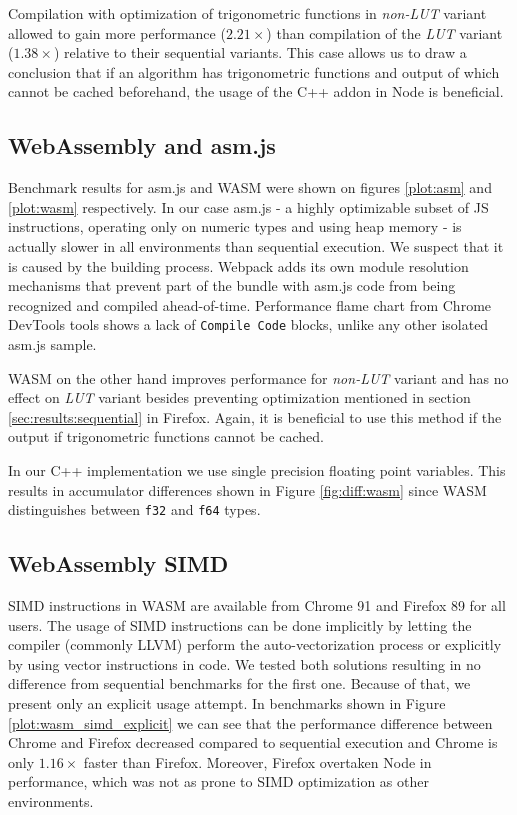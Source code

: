 
Compilation with optimization of trigonometric functions in \textit{non-LUT} variant allowed to gain more performance ($2.21\times$) than compilation of the \textit{LUT} variant ($1.38\times$) relative to their sequential variants. This case allows us to draw a conclusion that if an algorithm has trigonometric functions and output of which cannot be cached beforehand, the usage of the C++ addon in Node is beneficial.

\subsection{WebAssembly and asm.js}\label{sec:results:asm-wasm}

Benchmark results for asm.js and WASM were shown on figures \ref{plot:asm} and \ref{plot:wasm} respectively. In our case asm.js - a highly optimizable subset of JS instructions, operating only on numeric types and using heap memory - is actually slower in all environments than sequential execution. We suspect that it is caused by the building process. Webpack adds its own module resolution mechanisms that prevent part of the bundle with asm.js code from being recognized and compiled ahead-of-time. Performance flame chart from Chrome DevTools tools shows a lack of \texttt{Compile Code} blocks, unlike any other isolated asm.js sample.

WASM on the other hand improves performance for \textit{non-LUT} variant and has no effect on \textit{LUT} variant besides preventing optimization mentioned in section \ref{sec:results:sequential} in Firefox. Again, it is beneficial to use this method if the output if trigonometric functions cannot be cached.

In our C++ implementation we use single precision floating point variables. This results in accumulator differences shown in Figure \ref{fig:diff:wasm} since WASM distinguishes between \texttt{f32} and \texttt{f64} types.






\subsection{WebAssembly SIMD}

SIMD instructions in WASM are available from Chrome 91 and Firefox 89 for all users. The usage of SIMD instructions can be done implicitly by letting the compiler (commonly LLVM) perform the auto-vectorization process or explicitly by using vector instructions in code. We tested both solutions resulting in no difference from sequential benchmarks for the first one. Because of that, we present only an explicit usage attempt. In benchmarks shown in Figure \ref{plot:wasm_simd_explicit} we can see that the performance difference between Chrome and Firefox decreased compared to sequential execution and Chrome is only $1.16\times$ faster than Firefox. Moreover, Firefox overtaken Node in performance, which was not as prone to SIMD optimization as other environments.

